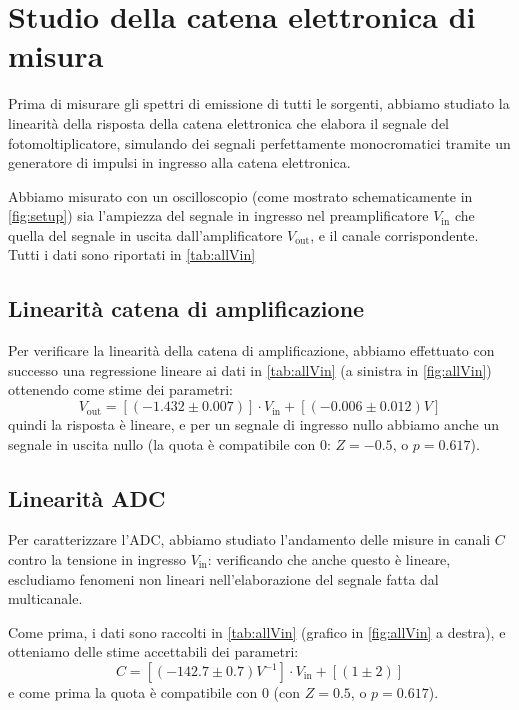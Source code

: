 \section{Studio della catena elettronica di misura} \label{sec:electronchain}

Prima di misurare gli spettri di emissione di tutti le sorgenti, abbiamo studiato la linearità della risposta della catena elettronica che elabora il segnale del fotomoltiplicatore, simulando dei segnali perfettamente monocromatici tramite un generatore di impulsi in ingresso alla catena elettronica.

Abbiamo misurato con un oscilloscopio (come mostrato schematicamente in \cref{fig:setup}) sia l'ampiezza del segnale in ingresso nel preamplificatore $ V_\text{in} $ che quella del segnale in uscita dall'amplificatore $ V_\text{out} $, e il canale corrispondente. Tutti i dati sono riportati in \cref{tab:allVin}

\subsection{Linearità catena di amplificazione}

Per verificare la linearità della catena di amplificazione, abbiamo effettuato con successo una regressione lineare ai dati in \cref{tab:allVin} (a sinistra in \cref{fig:allVin}) ottenendo come stime dei parametri:
\begin{equation}
V_\text{out} = [(-1.432 \pm 0.007)] \cdot V_\text{in} + [(-0.006 \pm 0.012) \unit{V}]
\end{equation}
quindi la risposta è lineare, e per un segnale di ingresso nullo abbiamo anche un segnale in uscita nullo (la quota è compatibile con $ 0 $: $ Z = -0.5 $, o $ p = 0.617 $). 

\subsection{Linearità ADC} 

Per caratterizzare l'ADC, abbiamo studiato l'andamento delle misure in canali $ C $ contro la tensione in ingresso $ V_\text{in} $: verificando che anche questo è lineare, escludiamo fenomeni non lineari nell'elaborazione del segnale fatta dal multicanale. 

Come prima, i dati sono raccolti in \cref{tab:allVin} (grafico in \cref{fig:allVin} a destra), e otteniamo delle stime accettabili dei parametri:
\begin{equation}
C = [(-142.7 \pm 0.7) \unit{V^{-1}}] \cdot V_\text{in} + [(1 \pm 2)]
\end{equation}
e come prima la quota è compatibile con $ 0 $ (con $ Z = 0.5 $, o $ p = 0.617 $).

